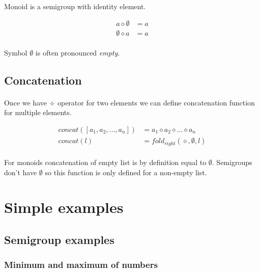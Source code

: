 \documentclass{article}
\begin{document}
    \paragraph{}
    Monoid is a semigroup with identity element.

    \begin{align*}
        a \diamond \emptyset &= a \\
        \emptyset \diamond a &= a
    \end{align*}

    \paragraph{}
    Symbol $\emptyset$ is often pronounced \textit{empty}.

\subsection{Concatenation}

    \paragraph{}
    Once we have $\diamond$ operator for two elements we can define concatenation function for multiple elements.

    \begin{align*}
        concat([a_1, a_2, ..., a_n]) &= a_1 \diamond a_2 \diamond ... \diamond a_n \\
        concat(l) &= fold_{right}(\diamond, \emptyset, l)
    \end{align*}

    \paragraph{}
    For monoids concatenation of empty list is by definition equal to $\emptyset$.
    Semigroups don't have $\emptyset$ so this function is only defined for a non-empty list. 

\section{Simple examples}

    \subsection{Semigroup examples}

    \subsubsection{Minimum and maximum of numbers}
\end{document}
